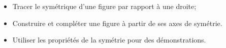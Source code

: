 \begin{myobj}
	\begin{itemize}
		
		\item Tracer le symétrique d'une figure par rapport à une droite;
		\item Construire et compléter une figure à partir de ses axes de symétrie.
		\item Utiliser les propriétés de la symétrie pour des démonstrations.
	\end{itemize}
\end{myobj}
%



